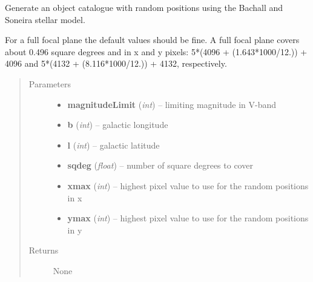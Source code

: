\documentclass[a4paper,11pt,english]{sphinxmanual}
\begin{document}

\begin{fulllineitems}
\label{sources:sources.createObjectCatalogue.starCatalogueBachallSoneira}
Generate an object catalogue with random positions using the Bachall and Soneira stellar model.

For a full focal plane the default values should be fine. A full focal plane covers about 0.496 square degrees
and in x and y pixels:
5*(4096 + (1.643*1000/12.)) + 4096 and
5*(4132 + (8.116*1000/12.)) + 4132, respectively.
\begin{quote}\begin{description}
\item[{Parameters}] \leavevmode\begin{itemize}
\item {} 
\textbf{magnitudeLimit} (\emph{int}) -- limiting magnitude in V-band

\item {} 
\textbf{b} (\emph{int}) -- galactic longitude

\item {} 
\textbf{l} (\emph{int}) -- galactic latitude

\item {} 
\textbf{sqdeg} (\emph{float}) -- number of square degrees to cover

\item {} 
\textbf{xmax} (\emph{int}) -- highest pixel value to use for the random positions in x

\item {} 
\textbf{ymax} (\emph{int}) -- highest pixel value to use for the random positions in y

\end{itemize}

\item[{Returns}] \leavevmode
None

\end{description}\end{quote}

\end{fulllineitems}

\label{sources:module-sources.generatePostageStamps}
\end{document}
